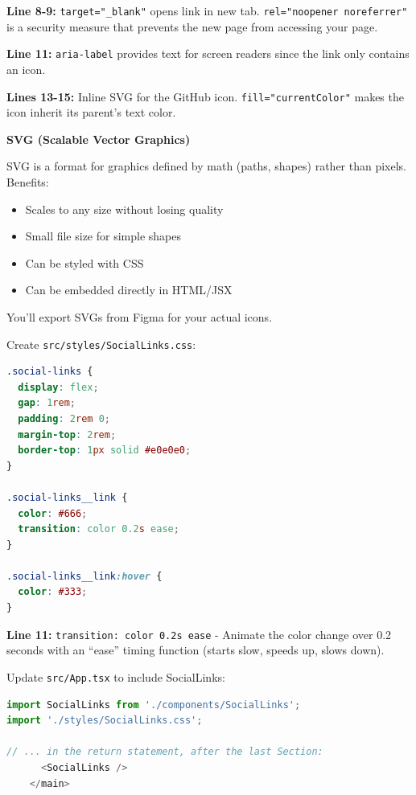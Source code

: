 \documentclass[12pt,a4paper]{article}
\begin{document}
\begin{explanation}
\textbf{Line 8-9:} \texttt{target="\_blank"} opens link in new tab. \texttt{rel="noopener noreferrer"} is a security measure that prevents the new page from accessing your page.

\textbf{Line 11:} \texttt{aria-label} provides text for screen readers since the link only contains an icon.

\textbf{Lines 13-15:} Inline SVG for the GitHub icon. \texttt{fill="currentColor"} makes the icon inherit its parent's text color.
\end{explanation}

\begin{concept}
\textbf{SVG (Scalable Vector Graphics)}

SVG is a format for graphics defined by math (paths, shapes) rather than pixels. Benefits:
\begin{itemize}
    \item Scales to any size without losing quality
    \item Small file size for simple shapes
    \item Can be styled with CSS
    \item Can be embedded directly in HTML/JSX
\end{itemize}

You'll export SVGs from Figma for your actual icons.
\end{concept}

Create \texttt{src/styles/SocialLinks.css}:

\begin{lstlisting}[language=CSS,caption={src/styles/SocialLinks.css}]
.social-links {
  display: flex;
  gap: 1rem;
  padding: 2rem 0;
  margin-top: 2rem;
  border-top: 1px solid #e0e0e0;
}

.social-links__link {
  color: #666;
  transition: color 0.2s ease;
}

.social-links__link:hover {
  color: #333;
}
\end{lstlisting}

\begin{explanation}
\textbf{Line 11:} \texttt{transition: color 0.2s ease} - Animate the color change over 0.2 seconds with an ``ease'' timing function (starts slow, speeds up, slows down).
\end{explanation}

Update \texttt{src/App.tsx} to include SocialLinks:

\begin{lstlisting}[language=JavaScript,caption={Add to App.tsx}]
import SocialLinks from './components/SocialLinks';
import './styles/SocialLinks.css';

// ... in the return statement, after the last Section:
      <SocialLinks />
    </main>
\end{lstlisting}
\end{document}
